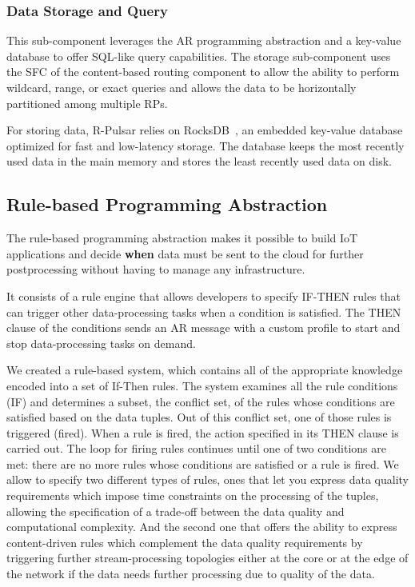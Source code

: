 \subsubsection{Data Storage and Query}

This sub-component leverages the AR programming abstraction and a key-value database to offer SQL-like query capabilities. The storage sub-component uses the SFC of the content-based routing component to allow the ability to perform wildcard, range, or exact queries and allows the data to be horizontally partitioned among multiple RPs. 

For storing data, R-Pulsar relies on RocksDB~\cite{rocks}, an embedded key-value database optimized for fast and low-latency storage. The database keeps the most recently used data in the main memory and stores the least recently used data on disk.

\subsection{Rule-based Programming Abstraction}\label{sec:programming-data}
The rule-based programming abstraction makes it possible to build IoT applications and decide \textbf{when} data must be sent to the cloud for further postprocessing without having to manage any infrastructure.

It consists of a rule engine that allows developers to specify IF-THEN rules that can trigger other data-processing tasks when a condition is satisfied. The THEN clause of the conditions sends an AR message with a custom profile to start and stop data-processing tasks on demand. %

We created a rule-based system, which contains all of the appropriate knowledge encoded into a set of If-Then rules. The system examines all the rule conditions (IF) and determines a subset, the conflict set, of the rules whose conditions are satisfied based on the data tuples. Out of this conflict set, one of those rules is triggered (fired). When a rule is fired, the action specified in its THEN clause is carried out. The loop for firing rules continues until one of two conditions are met: there are no more rules whose conditions are satisfied or a rule is fired. We allow to specify two different types of rules, ones that let you express data quality requirements which impose time constraints on the processing of the tuples, allowing the specification of a trade-off between the data quality and computational complexity. And the second one that offers the ability to express content-driven rules which complement the data quality requirements by triggering further stream-processing topologies either at the core or at the edge of the network if the data needs further processing due to quality of the data.

